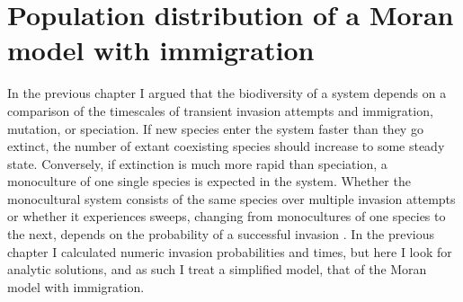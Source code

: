 \section{Population distribution of a Moran model with immigration}
In the previous chapter I argued that the biodiversity of a system depends on a comparison of the timescales of transient invasion attempts and immigration, mutation, or speciation. 
If new species enter the system faster than they go extinct, the number of extant coexisting species should increase to some steady state. %
Conversely, if extinction is much more rapid than speciation, a monoculture of one single species is expected in the system. 
Whether the monocultural system consists of the same species over multiple invasion attempts or whether it experiences sweeps, changing from monocultures of one species to the next, depends on the probability of a successful invasion \cite{Chesson1997,Chesson2000,Desai2007,Desai2007}. 
In the previous chapter I calculated numeric invasion probabilities and times, but here I look for analytic solutions, and as such I treat a simplified model, that of the Moran model with immigration. 

